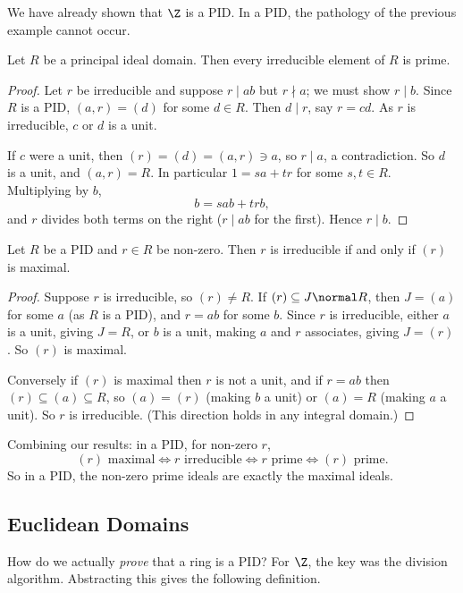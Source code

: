 We have already shown that $\Z$ is a PID. In a PID, the pathology of the previous example cannot occur.

\begin{proposition}
	Let $R$ be a principal ideal domain. Then every irreducible element of $R$ is prime.
\end{proposition}
\begin{proof}
	Let $r$ be irreducible and suppose $r \mid ab$ but $r \nmid a$; we must show $r \mid b$. Since $R$ is a PID, $(a, r) = (d)$ for some $d \in R$. Then $d \mid r$, say $r = cd$. As $r$ is irreducible, $c$ or $d$ is a unit.

	If $c$ were a unit, then $(r) = (d) = (a, r) \ni a$, so $r \mid a$, a contradiction. So $d$ is a unit, and $(a, r) = R$. In particular $1 = sa + tr$ for some $s, t \in R$. Multiplying by $b$,
	$$
	b = sab + trb,
	$$
	and $r$ divides both terms on the right ($r \mid ab$ for the first). Hence $r \mid b$.
\end{proof}

\begin{lemma}
	Let $R$ be a PID and $r \in R$ be non-zero. Then $r$ is irreducible if and only if $(r)$ is maximal.
\end{lemma}
\begin{proof}
	Suppose $r$ is irreducible, so $(r) \neq R$. If $(r) \subseteq J \normal R$, then $J = (a)$ for some $a$ (as $R$ is a PID), and $r = ab$ for some $b$. Since $r$ is irreducible, either $a$ is a unit, giving $J = R$, or $b$ is a unit, making $a$ and $r$ associates, giving $J = (r)$. So $(r)$ is maximal.

	Conversely if $(r)$ is maximal then $r$ is not a unit, and if $r = ab$ then $(r) \subseteq (a) \subseteq R$, so $(a) = (r)$ (making $b$ a unit) or $(a) = R$ (making $a$ a unit). So $r$ is irreducible. (This direction holds in any integral domain.)
\end{proof}

Combining our results: in a PID, for non-zero $r$,
$$
(r) \text{ maximal} \iff r \text{ irreducible} \iff r \text{ prime} \iff (r) \text{ prime}.
$$
So in a PID, the non-zero prime ideals are exactly the maximal ideals.

\subsection{Euclidean Domains}

How do we actually \emph{prove} that a ring is a PID? For $\Z$, the key was the division algorithm. Abstracting this gives the following definition.


